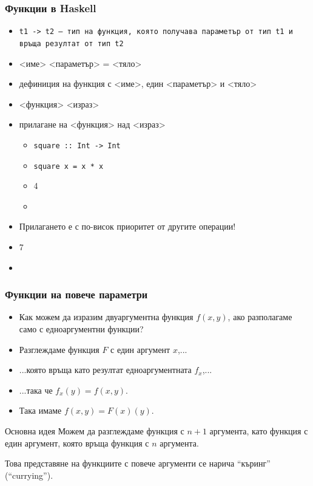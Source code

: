 \documentclass[alsotrans]{beamerswitch}
\begin{document}
\begin{frame}
  \frametitle{Функции в Haskell}

  \begin{itemize}[<+->]
  \item \tt{t1 -> t2} --- тип на функция, която получава параметър от тип \tt{t1} и връща резултат от тип \tt{t2}
  \item {}<име> <параметър> \tta= <тяло>
  \item дефиниция на функция с <име>, един <параметър> и <тяло>
  \item {}<функция> <израз>
  \item прилагане на <функция> над <израз>
    \begin{itemize}[<.->]
    \item \tt{square :: Int -> Int}
    \item \tt{square x = x * x}
    \item {}4
    \item {}
    \end{itemize}
  \item \alert{Прилагането е с по-висок приоритет от другите операции!}
  \item {}7
  \item {}
  \end{itemize}
\end{frame}

\begin{frame}
  \frametitle{Функции на повече параметри}
  \begin{itemize}[<+->]
  \item Как можем да изразим двуаргументна функция $f(x,y)$, ако разполагаме само с едноаргументни функции?
  \item Разглеждаме функция $F$ с един аргумент $x$,...
  \item ...която връща като резултат едноаргументната $f_x$,...
  \item ...така че $f_x(y) = f(x,y)$.
  \item Така имаме $f(x,y) = F(x)(y)$.
  \end{itemize}
  \onslide<+->
  \begin{block}{Основна идея}
    Можем да разглеждаме функция с $n+1$ аргумента, като функция с един аргумент, която връща функция с $n$ аргумента.
  \end{block}
  \onslide<+->
  \alert{Това представяне на функциите с повече аргументи се нарича ``къринг'' (``currying'').}
\end{frame}
\end{document}
